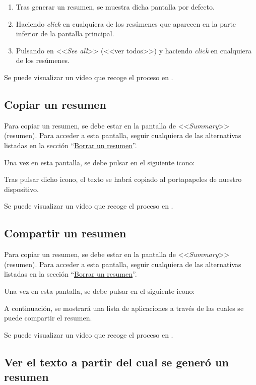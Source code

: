 \begin{enumerate}
	\item Tras generar un resumen, se muestra dicha pantalla por defecto.
	
	\item Haciendo \emph{click} en cualquiera de los resúmenes que aparecen en la parte inferior de la pantalla principal.
	
	\item Pulsando en <<\emph{See all}>> (<<ver todos>>) y haciendo \emph{click} en cualquiera de los resúmenes.
\end{enumerate}

Se puede visualizar un vídeo que recoge el proceso en \href{}{}.

\subsection{Copiar un resumen}

Para copiar un resumen, se debe estar en la pantalla de <<\emph{Summary}>> (resumen). Para acceder a esta pantalla, seguir cualquiera de las alternativas listadas en la sección ``\hyperref[subsection:borrar]{Borrar un resumen}''.

Una vez en esta pantalla, se debe pulsar en el siguiente icono:

Tras pulsar dicho icono, el texto se habrá copiado al portapapeles de nuestro dispositivo.

Se puede visualizar un vídeo que recoge el proceso en \href{}{}.

\subsection{Compartir un resumen}

Para copiar un resumen, se debe estar en la pantalla de <<\emph{Summary}>> (resumen). Para acceder a esta pantalla, seguir cualquiera de las alternativas listadas en la sección ``\hyperref[subsection:borrar]{Borrar un resumen}''.

Una vez en esta pantalla, se debe pulsar en el siguiente icono:

A continuación, se mostrará una lista de aplicaciones a través de las cuales se puede compartir el resumen.

Se puede visualizar un vídeo que recoge el proceso en \href{}{}.

\subsection{Ver el texto a partir del cual se generó un resumen}

